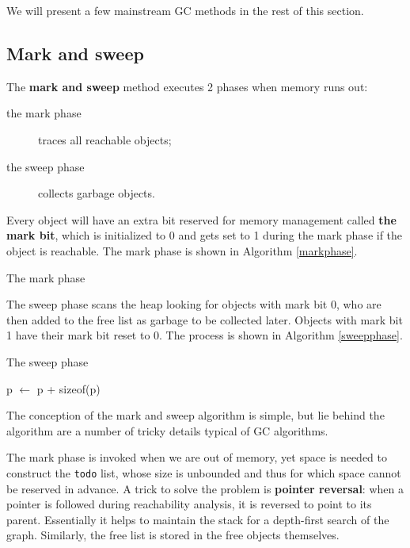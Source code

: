 We will present a few mainstream GC methods in the rest of this section.
\subsection{Mark and sweep}
The \textbf{mark and sweep} method executes 2 phases when memory runs out:
\begin{description}
\item[the mark phase]traces all reachable objects;
\item[the sweep phase]collects garbage objects.
\end{description}
Every object will have an extra bit reserved for memory management called \textbf{the mark bit}, which is initialized to 0 and gets set to 1 during the mark phase if the object is reachable. The mark phase is shown in Algorithm \ref{markphase}.
\begin{algorithm}
\caption{The mark phase}\label{markphase}
\begin{algorithmic}
\EndIf
\EndWhile
\end{algorithmic}
\end{algorithm}

The sweep phase scans the heap looking for objects with mark bit 0, who are then added to the free list as garbage to be collected later. Objects with mark bit 1 have their mark bit reset to 0. The process is shown in Algorithm \ref{sweepphase}.
\begin{algorithm}
\caption{The sweep phase}\label{sweepphase}
\begin{algorithmic}
\Else{}
\EndIf
p $\leftarrow$ p + sizeof(p)
\EndWhile
\end{algorithmic}
\end{algorithm}

The conception of the mark and sweep algorithm is simple, but lie behind the algorithm are a number of tricky details typical of GC algorithms. 

The mark phase is invoked when we are out of memory, yet space is needed to construct the \texttt{todo} list, whose size is unbounded and thus for which space cannot be reserved in advance. A trick to solve the problem is \textbf{pointer reversal}: when a pointer is followed during reachability analysis, it is reversed to point to its parent. Essentially it helps to maintain the stack for a depth-first search of the graph. Similarly, the free list is stored in the free objects themselves.

